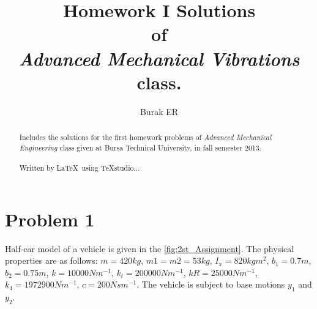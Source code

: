 \documentclass[]{report}
\title{Homework I Solutions \\ of \\ \emph{Advanced Mechanical Vibrations} class.}
\author{Burak ER}
\begin{document}
\maketitle
\begin{abstract}
Includes the solutions for the first homework problems of \emph{Advanced Mechanical Engineering} class given at Bursa Technical University, in fall semester 2013.
\\
\\
Written by \LaTeX ~using TeXstudio...
\end{abstract}
\section*{Problem 1}
Half-car model of a vehicle is given in the \cref{fig:2st_Assignment}. The physical properties are as follows: $m=420kg$, $m1=m2=53kg$, $I_x=820 kgm^2$, $b_1=0.7m$, $b_2=0.75m$, $k =10000Nm^{-1}$, $k_t=200000 Nm^{-1}$, $kR=25000 Nm^{-1}$, $k_4= 1972900 Nm^{-1}$, $c=200 Nsm^{-1}$. The vehicle is subject to base motions $y_1$ and $y_2$.
\end{document}
